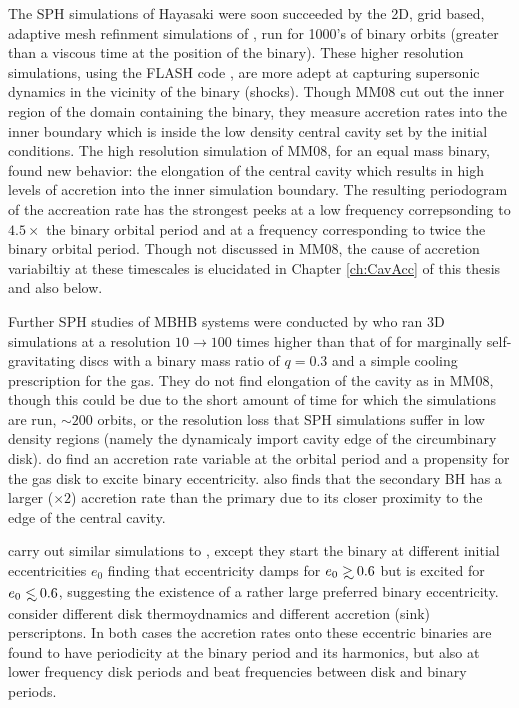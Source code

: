 The SPH simulations of Hayasaki were soon succeeded by the 2D, grid based,
adaptive mesh refinment simulations of \citep[][hereafter
MM08]{MacFadyen:2008},  run for 1000's of binary orbits (greater than a
viscous time at the position of the binary). These higher resolution
simulations, using the FLASH code \citep{Fryxell:2000}, are more adept at
capturing supersonic dynamics in the vicinity of the binary (shocks). Though
MM08 cut out the inner region of the domain containing the binary, they
measure accretion rates into the inner boundary which is inside the low
density central cavity set by the initial conditions. The high resolution
simulation of MM08, for an equal mass binary, found new behavior: the
elongation of the central cavity which results in high levels of accretion
into the inner simulation boundary. The resulting periodogram of the
accreation rate has the strongest peeks at a low frequency correpsonding to
$4.5 \times$ the binary orbital period and at a frequency corresponding to
twice the binary orbital period. Though not discussed in MM08, the cause of
accretion variabiltiy at these timescales is elucidated in Chapter
\ref{ch:CavAcc} of this thesis and also \citep{ShiKrolik:2012} below.


Further SPH studies of MBHB systems were conducted by \citep{Cuadra:2009} who
ran 3D simulations at a resolution $10 \rightarrow 100$ times higher than that of
\cite{Hayasaki:2007} for marginally self-gravitating discs with a binary mass
ratio of $q=0.3$ and a simple cooling prescription for the gas. They do not
find elongation of the cavity as in MM08, though this could be due to the
short amount of time for which the simulations are run, $\sim 200$ orbits, or
the resolution loss that SPH simulations suffer in low density regions (namely
the dynamicaly import cavity edge of the circumbinary disk).
\citep{Cuadra:2009} do find an accretion rate variable at the orbital period
and a propensity for the gas disk to excite binary eccentricity.
\citep{Cuadra:2009} also finds that the secondary BH has a larger ($\times 2$)
accretion rate than the primary due to its closer proximity to the edge of
the central cavity.


\citep{Roedig:2012:Trqs} carry out similar simulations to \citep{Cuadra:2009}, except they start the binary at different initial eccentricities $e_0$ finding that eccentricity damps for $e_0 \gsim 0.6$ but is excited for $e_0 \lsim 0.6$, suggesting the existence of a rather large preferred binary eccentricity. \citep{Roedig:2011:eccevo} consider different disk thermoydnamics and different accretion (sink) perscriptons. In both cases the accretion rates onto these eccentric binaries are found to have periodicity at the binary period and its harmonics, but also at lower frequency disk periods and beat frequencies between disk and binary periods.


